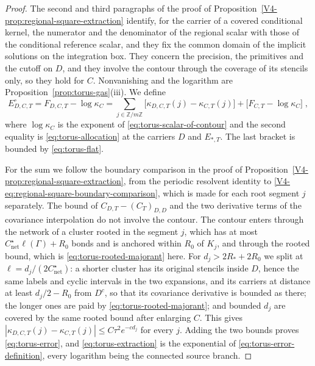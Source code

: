 \documentclass[11pt]{article}
\numberwithin{equation}{section}
\theoremstyle{remark}
\theoremstyle{plain}
\begin{document}
\begin{proof}
The second and third paragraphs of the proof of Proposition~\ref{V4-prop:regional-square-extraction} identify, for the carrier of a covered conditional kernel, the numerator and the denominator of the regional scalar with those of the conditional reference scalar, and they fix the common domain of the implicit solutions on the integration box. They concern the precision, the primitives and the cutoff on $D$, and they involve the contour through the coverage of its stencils only, so they hold for $C$. Nonvanishing and the logarithm are Proposition~\ref{prop:torus-gas}(iii). We define
\begin{equation}\label{eq:torus-error-definition}
    E^{\circ}_{D,C,T}= F_{D,C,T}-\log\kappa_C
        =\sum_{j\in\mathbb Z/m\mathbb Z}\bigl[\kappa_{D,C,T}(j)-\kappa_{C,T}(j)\bigr]
        +\bigl[F_{C,T}-\log\kappa_C\bigr]\;,
\end{equation}
where $\log\kappa_C$ is the exponent of \eqref{eq:torus-scalar-of-contour} and the second equality is \eqref{eq:torus-allocation} at the carriers $D$ and $E_{*,T}$. The last bracket is bounded by \eqref{eq:torus-flat}.

For the sum we follow the boundary comparison in the proof of Proposition~\ref{V4-prop:regional-square-extraction}, from the periodic resolvent identity to \eqref{V4-eq:regional-square-boundary-comparison}, which is made for each root segment $j$ separately. The bound of $C_{D,T}-(C_T)_{D,D}$ and the two derivative terms of the covariance interpolation do not involve the contour. The contour enters through the network of a cluster rooted in the segment $j$, which has at most $C_{\mathrm{net}}^{\star}\ell(\Gamma)+R_0$ bonds and is anchored within $R_0$ of $K_j$, and through the rooted bound, which is \eqref{eq:torus-rooted-majorant} here. For $d_j>2R_*+2R_0$ we split at $\ell= d_j/(2C_{\mathrm{net}}^{\star})$: a shorter cluster has its original stencils inside $D$, hence the same labels and cyclic intervals in the two expansions, and its carriers at distance at least $d_j/2-R_0$ from $D^c$, so that its covariance derivative is bounded as there; the longer ones are paid by \eqref{eq:torus-rooted-majorant}; and bounded $d_j$ are covered by the same rooted bound after enlarging $C$. This gives $|\kappa_{D,C,T}(j)-\kappa_{C,T}(j)|\leqslant C\tau^2e^{-cd_j}$ for every $j$. Adding the two bounds proves \eqref{eq:torus-error}, and \eqref{eq:torus-extraction} is the exponential of \eqref{eq:torus-error-definition}, every logarithm being the connected source branch.
\end{proof}
\end{document}
